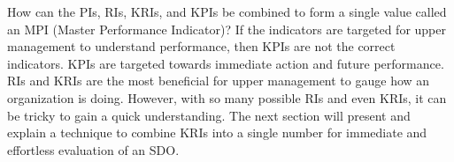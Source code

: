 \documentclass[SDSUThesis.tex]{subfiles}
\begin{document}
        How can the PIs, RIs, KRIs, and KPIs be combined to form a single
        value called an MPI (Master Performance Indicator)?  If the indicators
        are targeted for upper management to understand performance, then 
        KPIs are not the correct indicators.  KPIs are targeted towards
        immediate action and future performance.  RIs and KRIs are the most
        beneficial for upper management to gauge how an organization is doing.
        However, with so many possible RIs and even KRIs, it can be tricky
        to gain a quick understanding.  The next section will present
        and explain a technique to combine KRIs into a single number
        for immediate and  effortless evaluation of an SDO.
        
\end{document}
